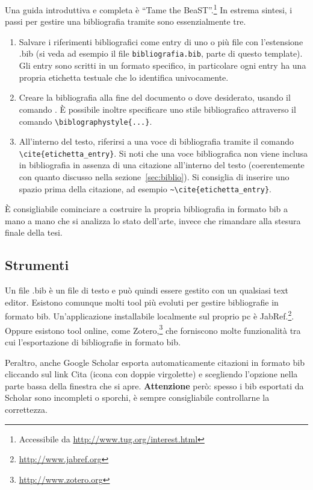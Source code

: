 \documentclass[12pt]{report}
\begin{document}
Una guida introduttiva e completa \`e ``Tame the BeaST''.\footnote{Accessibile da \url{http://www.tug.org/interest.html}} 
In estrema sintesi, i passi per gestire una bibliografia tramite  sono essenzialmente tre.
\begin{enumerate}
\item Salvare i riferimenti bibliografici come entry di uno o pi\`u file con l'estensione .bib (si veda ad esempio il file \texttt{bibliografia.bib}, parte di questo template). Gli entry sono scritti in un formato specifico, in particolare ogni entry ha una propria etichetta testuale che lo identifica univocamente.
\item Creare la bibliografia alla fine del documento o dove desiderato, usando il comando \verb||. \`E possibile inoltre specificare uno stile bibliografico attraverso il comando \verb|\biblographystyle{...}|.
\item All'interno del testo, riferirsi a una voce di bibliografia tramite il comando\\ \verb|\cite{etichetta_entry}|. Si noti che una voce bibliografica non viene inclusa in bibliografia in assenza di una citazione all'interno del testo (coerentemente con quanto discusso nella sezione~\ref{sec:biblio}).
Si consiglia di inserire uno spazio prima della citazione, ad esempio \verb|~\cite{etichetta_entry}|.
\end{enumerate}

\`E consigliabile cominciare a costruire la propria bibliografia in formato bib a mano a mano che si analizza lo stato dell'arte, invece che rimandare alla stesura finale della tesi.

\subsection{Strumenti}

Un file .bib \`e un file di testo e pu\`o quindi essere gestito con un qualsiasi text editor. Esistono comunque molti tool pi\`u evoluti per gestire bibliografie in formato bib. Un'applicazione installabile localmente sul proprio pc \`e JabRef.\footnote{\url{http://www.jabref.org}}. Oppure esistono tool online, come Zotero,\footnote{\url{http://www.zotero.org}} che forniscono molte funzionalità tra cui l'esportazione di bibliografie in formato bib.

Peraltro, anche Google Scholar esporta automaticamente citazioni in formato bib cliccando sul link Cita (icona con doppie virgolette) e scegliendo l'opzione  nella parte bassa della finestra che si apre. \textbf{Attenzione} per\`o: spesso i bib esportati da Scholar sono incompleti o sporchi, \`e sempre consigliabile controllarne la correttezza.
\end{document}
